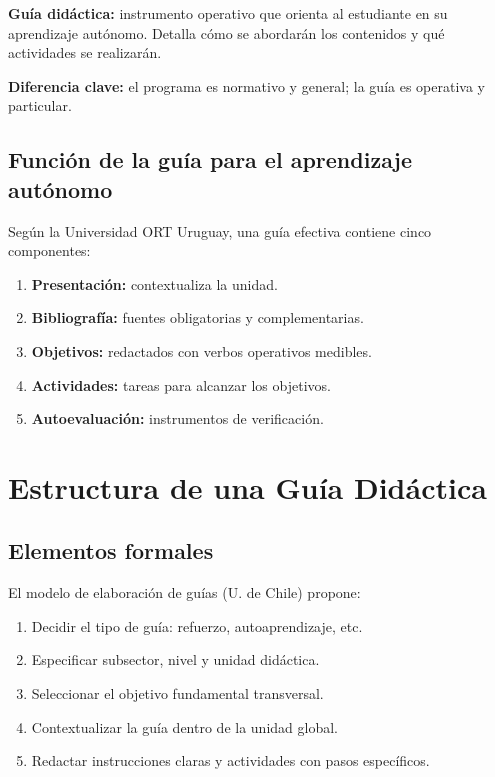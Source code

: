\documentclass[12pt,a4paper]{article}
\begin{document}
\textbf{Guía didáctica:} instrumento operativo que orienta al estudiante en su aprendizaje autónomo. Detalla cómo se abordarán los contenidos y qué actividades se realizarán.

\textbf{Diferencia clave:} el programa es normativo y general; la guía es operativa y particular.

\subsection{Función de la guía para el aprendizaje autónomo}

Según la Universidad ORT Uruguay, una guía efectiva contiene cinco componentes:
\begin{enumerate}
    \item \textbf{Presentación:} contextualiza la unidad.
    \item \textbf{Bibliografía:} fuentes obligatorias y complementarias.
    \item \textbf{Objetivos:} redactados con verbos operativos medibles.
    \item \textbf{Actividades:} tareas para alcanzar los objetivos.
    \item \textbf{Autoevaluación:} instrumentos de verificación.
\end{enumerate}

\section{Estructura de una Guía Didáctica}

\subsection{Elementos formales}

El modelo de elaboración de guías (U. de Chile) propone:
\begin{enumerate}
    \item Decidir el tipo de guía: refuerzo, autoaprendizaje, etc.
    \item Especificar subsector, nivel y unidad didáctica.
    \item Seleccionar el objetivo fundamental transversal.
    \item Contextualizar la guía dentro de la unidad global.
    \item Redactar instrucciones claras y actividades con pasos específicos.
\end{enumerate}
\end{document}
